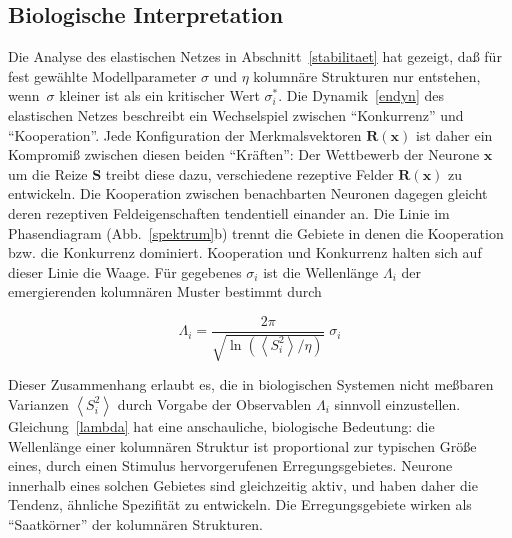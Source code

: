 \subsection{Biologische Interpretation}
\label{biointerpret}

Die Analyse des elastischen Netzes in Abschnitt~\ref{stabilitaet} hat
gezeigt, daß für fest gewählte Modellparameter $\sigma$ und $\eta$
kolumnäre Strukturen nur entstehen, wenn~$\sigma$ kleiner ist als ein
kritischer Wert $\sigma_i^\ast$.  Die Dynamik~\eqref{endyn} des elastischen
Netzes beschreibt ein Wechselspiel zwischen ``Konkurrenz'' und
``Kooperation''.  Jede Konfiguration der Merkmalsvektoren $\mathbf{R(x)}$
ist daher ein Kompromiß zwischen diesen beiden ``Kräften'': Der
Wettbewerb der Neurone $\mathbf{x}$ um die Reize $\mathbf{S}$ treibt diese
dazu, verschiedene rezeptive Felder $\mathbf{R(x)}$ zu entwickeln. Die
Kooperation zwischen benachbarten Neuronen dagegen gleicht deren rezeptiven
Feldeigenschaften tendentiell einander an.  Die Linie im Phasendiagram
(Abb.~\ref{spektrum}b) trennt die Gebiete in denen die Kooperation
bzw. die Konkurrenz dominiert. Kooperation und Konkurrenz halten sich auf
dieser Linie die Waage. Für gegebenes $\sigma_i$ ist die Wellenlänge
$\Lambda_i$ der emergierenden kolumnären Muster bestimmt durch

\begin{equation}
\Lambda_i = \frac{2 \pi}{\sqrt{\ln\left(\left<S_i^2\right>/\eta\right)}}\;\sigma_i
\label{lambda}
\end{equation}

Dieser Zusammenhang erlaubt es, die in biologischen Systemen nicht
meßbaren Varianzen $\left<S_i^2\right>$ durch Vorgabe der Observablen
$\Lambda_i$ sinnvoll einzustellen.  Gleichung~\eqref{lambda} hat eine
anschauliche, biologische Bedeutung: die Wellenlänge einer kolumnären
Struktur ist proportional zur typischen Größe eines, durch einen Stimulus
hervorgerufenen Erregungsgebietes. Neurone innerhalb eines solchen Gebietes
sind gleichzeitig aktiv, und haben daher die Tendenz, ähnliche Spezifität
zu entwickeln. Die Erregungsgebiete wirken als ``Saatkörner'' der
kolumnären Strukturen.
